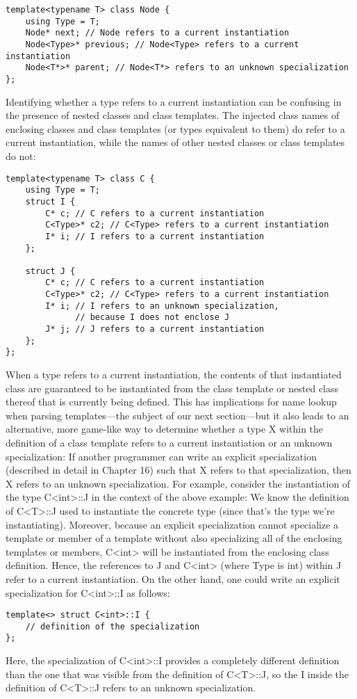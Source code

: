 \begin{lstlisting}[style=styleCXX]
template<typename T> class Node {
	using Type = T;
	Node* next; // Node refers to a current instantiation
	Node<Type>* previous; // Node<Type> refers to a current instantiation
	Node<T*>* parent; // Node<T*> refers to an unknown specialization
};
\end{lstlisting}

Identifying whether a type refers to a current instantiation can be confusing in the presence of nested classes and class templates. The injected class names of enclosing classes and class templates (or types equivalent to them) do refer to a current instantiation, while the names of other nested classes or class templates do not:

\begin{lstlisting}[style=styleCXX]
template<typename T> class C {
	using Type = T;
	struct I {
		C* c; // C refers to a current instantiation
		C<Type>* c2; // C<Type> refers to a current instantiation
		I* i; // I refers to a current instantiation
	};

	struct J {
		C* c; // C refers to a current instantiation
		C<Type>* c2; // C<Type> refers to a current instantiation
		I* i; // I refers to an unknown specialization,
			  // because I does not enclose J
		J* j; // J refers to a current instantiation
	};
};
\end{lstlisting}

When a type refers to a current instantiation, the contents of that instantiated class are guaranteed to be instantiated from the class template or nested class thereof that is currently being defined. This has implications for name lookup when parsing templates—the subject of our next section—but it also leads to an alternative, more game-like way to determine whether a type X within the definition of a class template refers to a current instantiation or an unknown specialization: If another programmer can write an explicit specialization (described in detail in Chapter 16) such that X refers to that specialization, then X refers to an unknown specialization. For example, consider the instantiation of the type C<int>::J in the context of the above example: We know the definition of C<T>::J used to instantiate the concrete type (since that’s the type we’re instantiating). Moreover, because an explicit specialization cannot specialize a template or member of a template without also specializing all of the enclosing templates or members, C<int> will be instantiated from the enclosing class definition. Hence, the references to J and C<int> (where Type is int) within J refer to a current instantiation. On the other hand, one could write an explicit specialization for C<int>::I as follows:

\begin{lstlisting}[style=styleCXX]
template<> struct C<int>::I {
	// definition of the specialization
};
\end{lstlisting}

Here, the specialization of C<int>::I provides a completely different definition than the one that was visible from the definition of C<T>::J, so the I inside the definition of C<T>::J refers to an unknown specialization.


